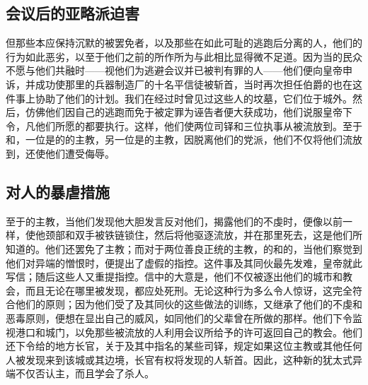
\subsection{会议后的亚略派迫害}

但那些本应保持沉默的被罢免者，以及那些在如此可耻的逃跑后分离的人，他们的行为如此恶劣，以至于他们之前的所作所为与此相比显得微不足道。因为当的民众不愿与他们共融时——视他们为逃避会议并已被判有罪的人——他们便向皇帝申诉，并成功使那里的兵器制造厂的十名平信徒被斩首，当时再次担任伯爵的也在这件事上协助了他们的计划。我们在经过时曾见过这些人的坟墓，它们位于城外。然后，仿佛他们因自己的逃跑而免于被定罪为诬告者便大获成功，他们说服皇帝下令，凡他们所愿的都要执行。这样，他们使两位司铎和三位执事从被流放到。至于和，一位是的的主教，另一位是的主教，因脱离他们的党派，他们不仅将他们流放到，还使他们遭受侮辱。\par


\subsection{对人的暴虐措施}

至于的主教，当他们发现他大胆发言反对他们，揭露他们的不虔时，便像以前一样，使他颈部和双手被铁链锁住，然后将他驱逐流放，并在那里死去，这是他们所知道的。他们还罢免了主教；而对于两位善良正统的主教，的和的，当他们察觉到他们对异端的憎恨时，便提出了虚假的指控。这件事及其同伙最先发难，皇帝就此写信；随后这些人又重提指控。信中的大意是，他们不仅被逐出他们的城市和教会，而且无论在哪里被发现，都应处死刑。无论这种行为多么令人惊讶，这完全符合他们的原则；因为他们受了及其同伙的这些做法的训练，又继承了他们的不虔和恶毒原则，便想在显出自己的威风，如同他们的父辈曾在所做的那样。他们下令监视港口和城门，以免那些被流放的人利用会议所给予的许可返回自己的教会。他们还下令给的地方长官，关于及其中指名的某些司铎，规定如果这位主教或其他任何人被发现来到该城或其边境，长官有权将发现的人斩首。因此，这种新的犹太式异端不仅否认主，而且学会了杀人。\par

